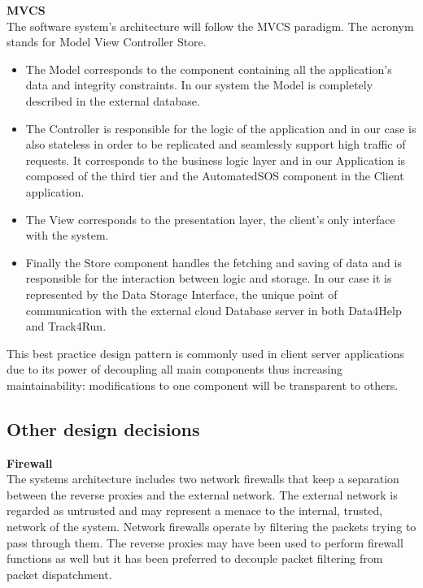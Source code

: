 \documentclass[titlepage]{article}
\begin{document}
{\bf MVCS}\\
The software system’s architecture will follow the MVCS paradigm. The acronym stands for Model View Controller Store.
\begin{itemize}
        \item {} The Model corresponds to the component containing all the application’s data and integrity constraints. In our system the Model is completely described in the external database.
		\item {} The Controller is responsible for the logic of the application and in our case is also stateless in order to be replicated and seamlessly support high traffic of requests. It corresponds to the business logic layer and in our Application is composed of the third tier and the AutomatedSOS component in the Client application. 
		\item {} The View corresponds to the presentation layer, the client’s only interface with the system. 
		\item {} Finally the Store component handles the fetching and saving of data and is responsible for the interaction between logic and storage. In our case it is represented by the Data Storage Interface, the unique point of communication with the external cloud Database server in both Data4Help and Track4Run.
    \end{itemize} 
This best practice design pattern is commonly used in client server applications due to its power of decoupling all main components thus increasing maintainability: modifications to one component will be transparent to others.
\pagebreak


\subsection{Other design decisions}

{\bf Firewall}\\
The systems architecture includes two network firewalls that keep a separation between the reverse proxies and the external network. The external network is regarded as untrusted and may represent a menace to the internal, trusted, network of the system.
Network firewalls operate by filtering the packets trying to pass through them.
The reverse proxies may have been used to perform firewall functions as well but it has been preferred to decouple packet filtering from packet dispatchment.\\
\end{document}
